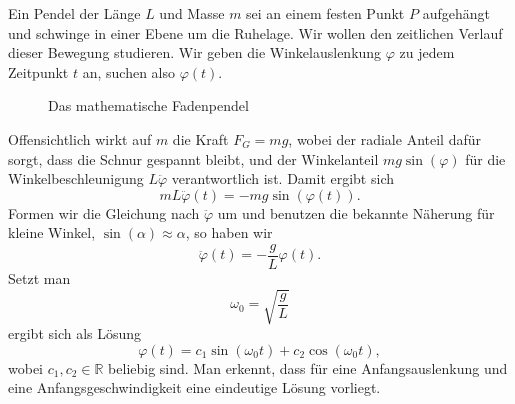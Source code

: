 \documentclass[%
11pt,%
twoside,%
titlepage,%
swissgerman,%
headsepline%
]{scrartcl}
\theoremstyle{definition}
\theoremstyle{plain}
\begin{document}
Ein
Pendel der Länge $L$ und Masse $m$ sei an einem festen Punkt $P$ aufgehängt und schwinge in einer Ebene um die Ruhelage. Wir wollen den zeitlichen Verlauf dieser Bewegung studieren. Wir geben die Winkelauslenkung $\varphi$ zu jedem Zeitpunkt $t$ an, suchen also $\varphi(t)$.

\begin{figure}
\begin{center}
\end{center}
\caption{Das mathematische Fadenpendel}
\end{figure}

Offensichtlich wirkt auf $m$ die Kraft $F_G=mg$, wobei der radiale Anteil dafür sorgt, dass die Schnur gespannt bleibt, und der Winkelanteil $mg\sin(\varphi)$ für die Winkelbeschleunigung $L\ddot{\varphi}$ verantwortlich ist. Damit ergibt sich
$$mL\ddot{\varphi}(t)=-mg\sin(\varphi(t)).$$
Formen wir die Gleichung nach $\ddot{\varphi}$ um und benutzen die bekannte Näherung für kleine Winkel, $\sin(\alpha)\approx\alpha$, so haben wir
\begin{equation}\label{eq:mathpendel}
\ddot{\varphi}(t)=-\frac{g}{L}\varphi(t).
\end{equation}
Setzt man
$$\omega_0=\sqrt{\frac{g}{L}}$$
ergibt sich als Lösung
$$\varphi(t)=c_1\sin(\omega_0 t)+c_2\cos(\omega_0 t),$$
wobei $c_1,c_2\in\mathbb{R}$ beliebig sind.
Man erkennt, dass für eine Anfangsauslenkung und eine Anfangsgeschwindigkeit eine eindeutige Lösung vorliegt.
\end{document}
